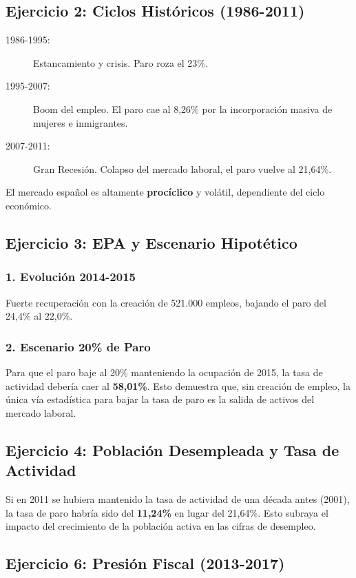 \subsection{Ejercicio 2: Ciclos Históricos (1986-2011)}

\begin{description}
    \item[1986-1995:] Estancamiento y crisis. Paro roza el 23\%.
    \item[1995-2007:] Boom del empleo. El paro cae al 8,26\% por la incorporación masiva de mujeres e inmigrantes.
    \item[2007-2011:] Gran Recesión. Colapso del mercado laboral, el paro vuelve al 21,64\%.
\end{description}
El mercado español es altamente \textbf{procíclico} y volátil, dependiente del ciclo económico.

\subsection{Ejercicio 3: EPA y Escenario Hipotético}

\subsubsection{1. Evolución 2014-2015}
Fuerte recuperación con la creación de 521.000 empleos, bajando el paro del 24,4\% al 22,0\%.

\subsubsection{2. Escenario 20\% de Paro}
Para que el paro baje al 20\% manteniendo la ocupación de 2015, la tasa de actividad debería caer al \textbf{58,01\%}. Esto demuestra que, sin creación de empleo, la única vía estadística para bajar la tasa de paro es la salida de activos del mercado laboral.

\subsection{Ejercicio 4: Población Desempleada y Tasa de Actividad}
Si en 2011 se hubiera mantenido la tasa de actividad de una década antes (2001), la tasa de paro habría sido del \textbf{11,24\%} en lugar del 21,64\%. Esto subraya el impacto del crecimiento de la población activa en las cifras de desempleo.

\subsection{Ejercicio 6: Presión Fiscal (2013-2017)}

